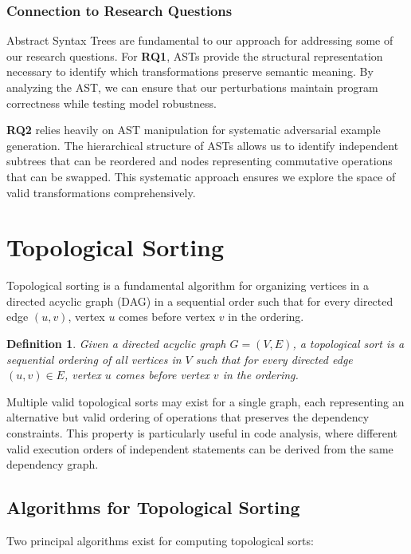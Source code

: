 \documentclass[%
thesis=student,%
coverpage=false,%
titlepage=false,%
headmarks=true, %
english,%
font=libertine, %
math=newpxtx, %
BCOR=5mm,%
coverBCOR=11mm%
]{tum-templates/book/tumbook}
\newtheorem{definition}{Definition}[section]
\begin{document}
\subsubsection{Connection to Research Questions}

Abstract Syntax Trees are fundamental to our approach for addressing some of our research questions. For \textbf{RQ1}, ASTs provide the structural representation necessary to identify which transformations preserve semantic meaning. By analyzing the AST, we can ensure that our perturbations maintain program correctness while testing model robustness.

\textbf{RQ2} relies heavily on AST manipulation for systematic adversarial example generation. The hierarchical structure of ASTs allows us to identify independent subtrees that can be reordered and nodes representing commutative operations that can be swapped. This systematic approach ensures we explore the space of valid transformations comprehensively.

\section{Topological Sorting}
\label{sec:Topological Sorting}

Topological sorting is a fundamental algorithm for organizing vertices in a directed acyclic graph (DAG) in a sequential order such that for every directed edge $(u, v)$, vertex $u$ comes before vertex $v$ in the ordering. 

\begin{definition}
Given a directed acyclic graph $G = (V, E)$, a topological sort is a sequential ordering of all vertices in $V$ such that for every directed edge $(u, v) \in E$, vertex $u$ comes before vertex $v$ in the ordering.
\end{definition}

Multiple valid topological sorts may exist for a single graph, each representing an alternative but valid ordering of operations that preserves the dependency constraints. This property is particularly useful in code analysis, where different valid execution orders of independent statements can be derived from the same dependency graph.

\subsection{Algorithms for Topological Sorting}

Two principal algorithms exist for computing topological sorts:
\end{document}
